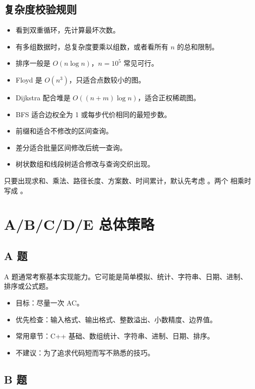 \subsection{复杂度校验规则}

\begin{itemize}
  \item 看到双重循环，先计算最坏次数。
  \item 有多组数据时，总复杂度要乘以组数，或者看所有 $n$ 的总和限制。
  \item 排序一般是 $O(n \log n)$，$n=10^5$ 常见可行。
  \item Floyd 是 $O(n^3)$，只适合点数较小的图。
  \item Dijkstra 配合堆是 $O((n+m)\log n)$，适合正权稀疏图。
  \item BFS 适合边权全为 1 或每步代价相同的最短步数。
  \item 前缀和适合不修改的区间查询。
  \item 差分适合批量区间修改后统一查询。
  \item 树状数组和线段树适合修改与查询交织出现。
\end{itemize}

只要出现求和、乘法、路径长度、方案数、时间累计，默认先考虑 。两个  相乘时写成 。

\section{A/B/C/D/E 总体策略}\label{sec:01-6}

\subsection{A 题}

A 题通常考察基本实现能力。它可能是简单模拟、统计、字符串、日期、进制、排序或公式题。

\begin{itemize}
  \item 目标：尽量一次 AC。
  \item 优先检查：输入格式、输出格式、整数溢出、小数精度、边界值。
  \item 常用章节：C++ 基础、数组统计、字符串、进制、日期、排序。
  \item 不建议：为了追求代码短而写不熟悉的技巧。
\end{itemize}

\subsection{B 题}

